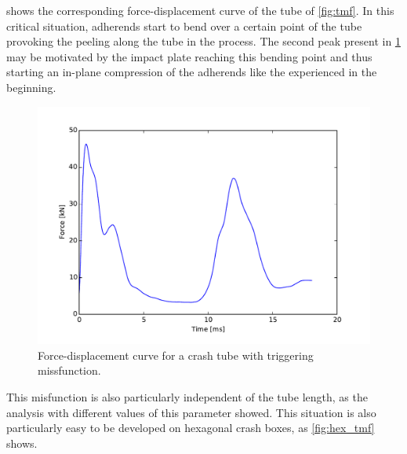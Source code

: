 \documentclass[
documentsize = a4, %
font = cmr, %
typesize = 11, %
printmode = true,
onehalfspacing = true,
language = en, %
titlepage = udciccp, %
degree = pt, %
dedication = true,
acknowledgements = true,
abstract-en = true,
abstract-es = false,
abstract-ga = false,
epigraphs = true,
toc = true,
lof = true,
lot = true,
frontmatterintoc = false,
notation = false,
minimal = false,
]{UDCthesis}
\begin{document}
 shows the corresponding force-displacement curve of the tube of \cref{fig:tmf}. In this critical situation, adherends start to bend over a certain point of the tube provoking the peeling along the tube in the process. The second peak present in \cref{fig:tmf_fd} may be motivated by the impact plate reaching this bending point and thus starting an in-plane compression of the adherends like the experienced in the beginning.

\begin{figure}
	\centering
	\includegraphics[width=0.7\linewidth]{IMG_CUTRES/tmf_fd}
	\caption{Force-displacement curve for a crash tube with triggering missfunction.}
	\label{fig:tmf_fd}
\end{figure}

This misfunction is also particularly independent of the tube length, as the analysis with different values of this parameter showed. This situation is also particularly easy to be developed on hexagonal crash boxes, as \cref{fig:hex_tmf} shows.
\end{document}
